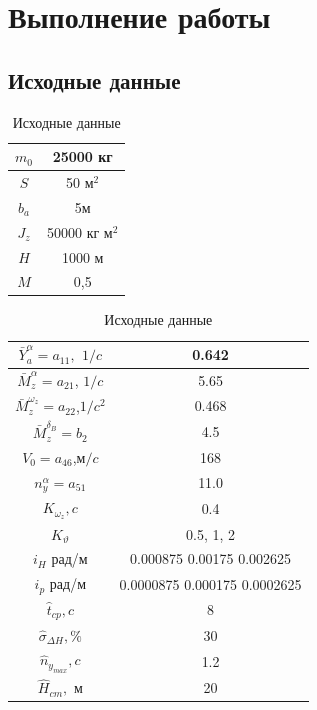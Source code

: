 \documentclass[a4paper,12pt]{article}
\begin{document}
\section{Выполнение работы}
    \subsection{Исходные данные}

    \begin{table}[H]
        \centering
        \caption{Исходные данные}
        \label{tab:Исходные данные 1}
        \begin{tabular}{|c|c|}
        \hline
            $m_0$ & 25000 кг  \\ \hline
            $S$ & 50 м$^2$ \\ \hline
            $b_a$ & 5м  \\ \hline
            $J_z$ & 50000 кг м$^2$ \\ \hline
            $H$ & 1000 м  \\ \hline
            $M$ & 0,5  \\ \hline
        \end{tabular}
    \end{table}
                                
    \begin{table}[H]
        \centering
        \caption{Исходные данные}
        \label{tab:Исходные данные 2}
        \begin{tabular}{|c|c|}
            \hline
            $\bar{Y}_a^\alpha=a_{11},$ $1/c$ &  0.642  \\ \hline
            $\bar{M}_z^{\alpha}=a_{21}$, $1/c$ &   5.65 \\ \hline
            $\bar{M}_z^{\omega_z}=a_{22}$,$1/c^2$ &  0.468 \\ \hline
            $\bar{M}^{\delta_B}_z=b_2$ & 4.5  \\ \hline
            $V_0=a_{46}$,м$/c$ & 168 \\ \hline
            $n_y^\alpha=a_{51}$ &  11.0  \\ \hline
            $K_{\omega_z}, c$ & 0.4 \\ \hline
            $K_\vartheta$  & 0.5, 1, 2  \\ \hline
            $i_H$ рад/м & 0.000875 0.00175 0.002625 \\ \hline
            $i_p$ рад/м & 0.0000875 0.000175 0.0002625 \\ \hline
            $\hat{t}_{cp},c$ & 8 \\ \hline
            $\hat{\sigma}_{\Delta H}, \%$ & 30 \\ \hline
            $\hat{n}_{y_{max}},c$ & 1.2 \\ \hline
            $\hat{H}_{cm},$ м & 20 \\ \hline
            \end{tabular}
    \end{table}
\end{document}
